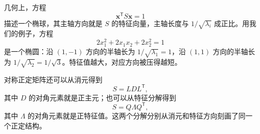 \documentclass[UTF8,a4paper,12pt]{ctexart}
\numberwithin{equation}{section}
\newcommand{\trans}{^{\mathsf T}}
\begin{document}
	几何上，方程
	\begin{equation}\label{eq:7.86}
	\bm{x}\trans S\bm{x}=1
	\end{equation}
	描述一个椭球，其主轴方向就是 $S$ 的特征向量，主轴长度与 $1/\sqrt{\lambda_i}$ 成正比。用我们的例子，方程
	\begin{equation}\label{eq:7.87}
	2x_1^2+2x_1x_2+2x_2^2=1
	\end{equation}
	是一个椭圆：沿 $(1,-1)$ 方向的半轴长为 $1/\sqrt{\lambda_1}=1$，沿 $(1,1)$ 方向的半轴长为 $1/\sqrt{\lambda_2}=1/\sqrt{3}$。特征值越大，对应方向被压得越短。

	对称正定矩阵还可以从消元得到
	\begin{equation}\label{eq:7.88}
	S=LDL\trans,
	\end{equation}
	其中 $D$ 的对角元素就是正主元；也可以从特征分解得到
	\begin{equation}\label{eq:7.89}
	S=Q\Lambda Q\trans,
	\end{equation}
	其中 $\Lambda$ 的对角元素就是正特征值。这两个分解分别从消元和特征方向刻画了同一个正定结构。
\end{document}
